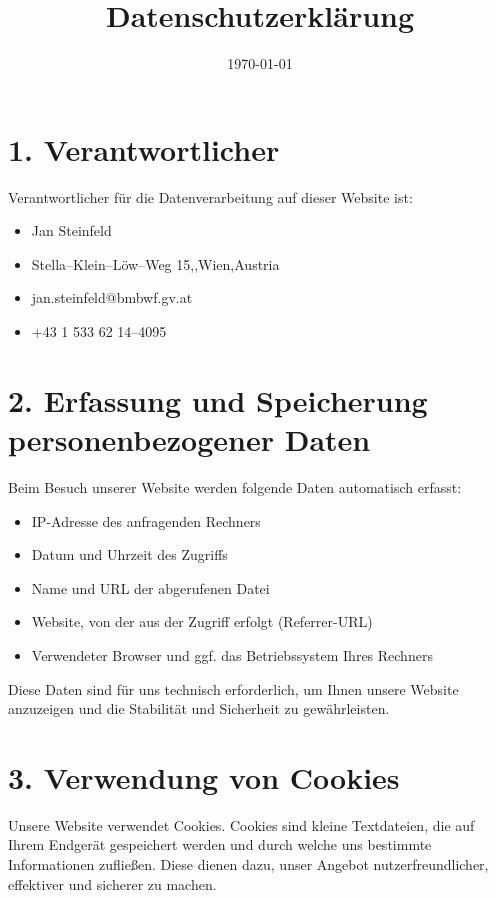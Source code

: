 \documentclass[a4paper,12pt]{article}
\title{Datenschutzerklärung}
\author{\Name}
\date{\today}
\makeatletter
\newcommand{\Strasse}{Stella--Klein--Löw--Weg 15}
\newcommand{\PLZ}{1020}
\newcommand{\Ort}{Wien}
\newcommand{\Land}{Austria}
\newcommand{\email}{jan.steinfeld@bmbwf.gv.at}
\newcommand{\Telefonnummer}{+43 1 533 62 14--4095}
\makeatother
\begin{document}
\maketitle

\section*{1. Verantwortlicher}

Verantwortlicher für die Datenverarbeitung auf dieser Website ist:

\begin{itemize}
    \item Jan Steinfeld
    \item \Strasse,\quad\PLZ,\quad\Ort,\quad\Land
    \item \email
    \item \Telefonnummer
\end{itemize}

\section*{2. Erfassung und Speicherung personenbezogener Daten}

Beim Besuch unserer Website werden folgende Daten automatisch erfasst:

\begin{itemize}
    \item IP-Adresse des anfragenden Rechners
    \item Datum und Uhrzeit des Zugriffs
    \item Name und URL der abgerufenen Datei
    \item Website, von der aus der Zugriff erfolgt (Referrer-URL)
    \item Verwendeter Browser und ggf. das Betriebssystem Ihres Rechners
\end{itemize}

Diese Daten sind für uns technisch erforderlich, um Ihnen unsere Website anzuzeigen und die Stabilität und Sicherheit zu gewährleisten.

\section*{3. Verwendung von Cookies}

Unsere Website verwendet Cookies. Cookies sind kleine Textdateien, die auf Ihrem Endgerät gespeichert werden und durch welche uns bestimmte Informationen zufließen. Diese dienen dazu, unser Angebot nutzerfreundlicher, effektiver und sicherer zu machen.
\end{document}
